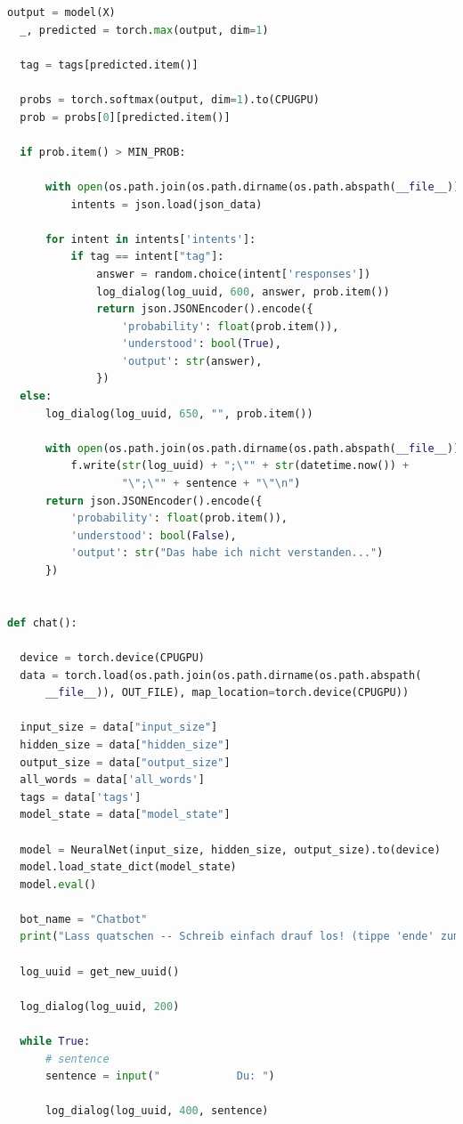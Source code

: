 \documentclass[12pt,oneside,titlepage,listof=totoc,bibliography=totoc]{scrartcl}
\begin{document}
\begin{appendices}
\begin{lstlisting}[language=python]
  output = model(X)
  _, predicted = torch.max(output, dim=1)

  tag = tags[predicted.item()]

  probs = torch.softmax(output, dim=1).to(CPUGPU)
  prob = probs[0][predicted.item()]

  if prob.item() > MIN_PROB:

      with open(os.path.join(os.path.dirname(os.path.abspath(__file__)), SRC_FILE), 'r', encoding='utf-8') as json_data:
          intents = json.load(json_data)

      for intent in intents['intents']:
          if tag == intent["tag"]:
              answer = random.choice(intent['responses'])
              log_dialog(log_uuid, 600, answer, prob.item())
              return json.JSONEncoder().encode({
                  'probability': float(prob.item()),
                  'understood': bool(True),
                  'output': str(answer),
              })
  else:
      log_dialog(log_uuid, 650, "", prob.item())

      with open(os.path.join(os.path.dirname(os.path.abspath(__file__)), OPEN_QUESTIONS_FILE), 'a', encoding='utf-8') as f:
          f.write(str(log_uuid) + ";\"" + str(datetime.now()) +
                  "\";\"" + sentence + "\"\n")
      return json.JSONEncoder().encode({
          'probability': float(prob.item()),
          'understood': bool(False),
          'output': str("Das habe ich nicht verstanden...")
      })


def chat():

  device = torch.device(CPUGPU)
  data = torch.load(os.path.join(os.path.dirname(os.path.abspath(
      __file__)), OUT_FILE), map_location=torch.device(CPUGPU))

  input_size = data["input_size"]
  hidden_size = data["hidden_size"]
  output_size = data["output_size"]
  all_words = data['all_words']
  tags = data['tags']
  model_state = data["model_state"]

  model = NeuralNet(input_size, hidden_size, output_size).to(device)
  model.load_state_dict(model_state)
  model.eval()

  bot_name = "Chatbot"
  print("Lass quatschen -- Schreib einfach drauf los! (tippe 'ende' zum beenden)")

  log_uuid = get_new_uuid()

  log_dialog(log_uuid, 200)

  while True:
      # sentence
      sentence = input("            Du: ")

      log_dialog(log_uuid, 400, sentence)


\end{lstlisting}
\end{appendices}
\end{document}
